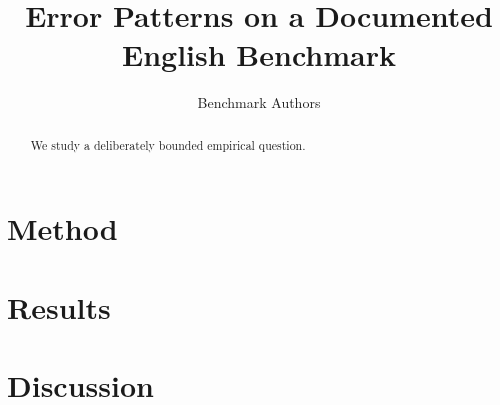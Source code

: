 \documentclass{article}
\title{Error Patterns on a Documented English Benchmark}
\author{Benchmark Authors}
\begin{document}
\maketitle
\begin{abstract}We study a deliberately bounded empirical question.\end{abstract}
\section{Method}
\section{Results}
\section{Discussion}
\end{document}
